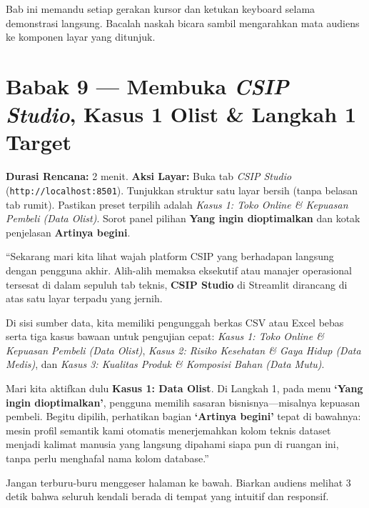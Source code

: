 \documentclass[11pt,a4paper,oneside]{book}
\newcommand{\code}[1]{{\small\nolinkurl{#1}}}
\begin{document}
Bab ini memandu setiap gerakan kursor dan ketukan keyboard selama demonstrasi langsung. Bacalah naskah bicara sambil mengarahkan mata audiens ke komponen layar yang ditunjuk.

\section{Babak 9 --- Membuka \emph{CSIP Studio}, Kasus 1 Olist \& Langkah 1 Target}

\begin{stagebox}
\textbf{Durasi Rencana:} 2 menit. \quad \textbf{Aksi Layar:} Buka tab \emph{CSIP Studio} (\code{http://localhost:8501}). Tunjukkan struktur satu layar bersih (tanpa belasan tab rumit). Pastikan preset terpilih adalah \emph{Kasus 1: Toko Online \& Kepuasan Pembeli (Data Olist)}. Sorot panel pilihan \textbf{Yang ingin dioptimalkan} dan kotak penjelasan \textbf{Artinya begini}.
\end{stagebox}

\begin{scriptbox}
``Sekarang mari kita lihat wajah platform CSIP yang berhadapan langsung dengan pengguna akhir. Alih-alih memaksa eksekutif atau manajer operasional tersesat di dalam sepuluh tab teknis, \textbf{CSIP Studio} di Streamlit dirancang di atas satu layar terpadu yang jernih.

Di sisi sumber data, kita memiliki pengunggah berkas CSV atau Excel bebas serta tiga kasus bawaan untuk pengujian cepat: \emph{Kasus 1: Toko Online \& Kepuasan Pembeli (Data Olist)}, \emph{Kasus 2: Risiko Kesehatan \& Gaya Hidup (Data Medis)}, dan \emph{Kasus 3: Kualitas Produk \& Komposisi Bahan (Data Mutu)}.

Mari kita aktifkan dulu \textbf{Kasus 1: Data Olist}. Di Langkah 1, pada menu \textbf{`Yang ingin dioptimalkan'}, pengguna memilih sasaran bisnisnya---misalnya kepuasan pembeli. Begitu dipilih, perhatikan bagian \textbf{`Artinya begini'} tepat di bawahnya: mesin profil semantik kami otomatis menerjemahkan kolom teknis dataset menjadi kalimat manusia yang langsung dipahami siapa pun di ruangan ini, tanpa perlu menghafal nama kolom database.''
\end{scriptbox}

\begin{tipbox}
Jangan terburu-buru menggeser halaman ke bawah. Biarkan audiens melihat 3 detik bahwa seluruh kendali berada di tempat yang intuitif dan responsif.
\end{tipbox}
\end{document}
